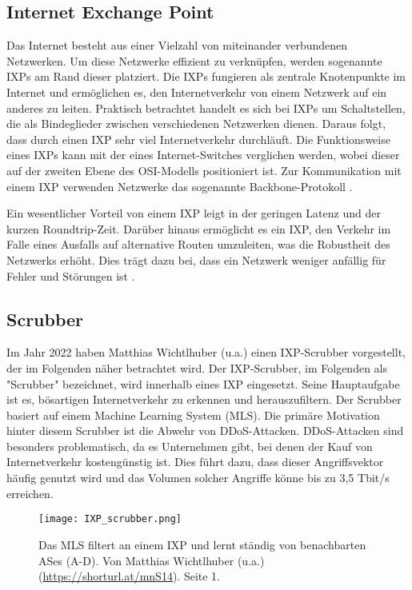 \documentclass[sigplan,screen]{acmart}
\begin{document}
\subsection{Internet Exchange Point}
Das Internet besteht aus einer Vielzahl von miteinander verbundenen Netzwerken. Um diese Netzwerke effizient zu verknüpfen, werden sogenannte IXPs am Rand dieser platziert. Die IXPs fungieren als zentrale Knotenpunkte im Internet und ermöglichen es, den Internetverkehr von einem Netzwerk auf ein anderes zu leiten. Praktisch betrachtet handelt es sich bei IXPs um Schaltstellen, die als Bindeglieder zwischen verschiedenen Netzwerken dienen. Daraus folgt, dass durch einen IXP sehr viel Internetverkehr durchläuft.
Die Funktionsweise eines IXPs kann mit der eines Internet-Switches verglichen werden, wobei dieser auf der zweiten Ebene des OSI-Modells positioniert ist. Zur Kommunikation mit einem IXP verwenden Netzwerke das sogenannte Backbone-Protokoll \cite{ixp01}. 

Ein wesentlicher Vorteil von einem IXP leigt in der geringen Latenz und der kurzen Roundtrip-Zeit. Darüber hinaus ermöglicht es ein IXP, den Verkehr im Falle eines Ausfalls auf alternative Routen umzuleiten, was die Robustheit des Netzwerks erhöht. Dies trägt dazu bei, dass ein Netzwerk weniger anfällig für Fehler und Störungen ist \cite{ixp02}. 

\subsection{Scrubber}

Im Jahr 2022 haben Matthias Wichtlhuber (u.a.) \cite{Hohlfeld01} einen IXP-Scrubber vorgestellt, der im Folgenden näher betrachtet wird. Der IXP-Scrubber, im Folgenden als "Scrubber" bezeichnet, wird innerhalb eines IXP eingesetzt. Seine Hauptaufgabe ist es, bösartigen Internetverkehr zu erkennen und herauszufiltern. Der Scrubber basiert auf einem Machine Learning System (MLS). Die primäre Motivation hinter diesem Scrubber ist die Abwehr von DDoS-Attacken. DDoS-Attacken sind besonders problematisch, da es Unternehmen gibt, bei denen der Kauf von Internetverkehr kostengünstig ist. Dies führt dazu, dass dieser Angriffsvektor häufig genutzt wird und das Volumen solcher Angriffe könne bis zu 3,5 Tbit/s erreichen.

\begin{figure}[h]
  \centering
  \texttt{[image: IXP\_scrubber.png]}
  \caption{Das MLS filtert an einem IXP und lernt ständig von benachbarten ASes (A-D). Von Matthias Wichtlhuber (u.a.) (\url{https://shorturl.at/mnS14}). Seite 1.}
  \label{fig:ixpScrubber}
\end{figure}
\end{document}
